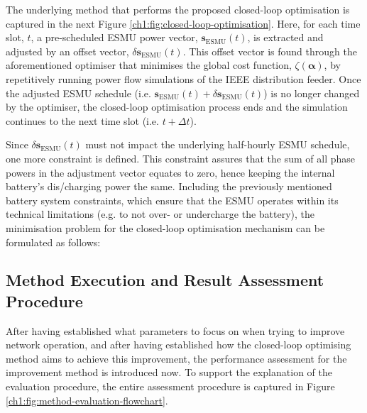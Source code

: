 

The underlying method that performs the proposed closed-loop optimisation is captured in the next Figure \ref{ch1:fig:closed-loop-optimisation}.
Here, for each time slot, $t$, a pre-scheduled ESMU power vector, $\textbf{s}_\text{ESMU}(t)$, is extracted and adjusted by an offset vector, $\delta \textbf{s}_\text{ESMU}(t)$.
This offset vector is found through the aforementioned optimiser that minimises the global cost function, $\zeta(\boldsymbol{\alpha})$, by repetitively running power flow simulations of the IEEE distribution feeder.
Once the adjusted ESMU schedule (i.e. $\textbf{s}_\text{ESMU}(t) + \delta \textbf{s}_\text{ESMU}(t)$) is no longer changed by the optimiser, the closed-loop optimisation process ends and the simulation continues to the next time slot (i.e. $t+\Delta t$).

Since $\delta \textbf{s}_\text{ESMU}(t)$ must not impact the underlying half-hourly ESMU schedule, one more constraint is defined.
This constraint assures that the sum of all phase powers in the adjustment vector equates to zero, hence keeping the internal battery's dis/charging power the same.
Including the previously mentioned battery system constraints, which ensure that the ESMU operates within its technical limitations (e.g. to not over- or undercharge the battery), the minimisation problem for the closed-loop optimisation mechanism can be formulated as follows:




\subsection{Method Execution and Result Assessment Procedure}
\label{ch1:subsec:method-execution}

After having established what parameters to focus on when trying to improve network operation, and after having established how the closed-loop optimising method aims to achieve this improvement, the performance assessment for the improvement method is introduced now.
To support the explanation of the evaluation procedure, the entire assessment procedure is captured in Figure \ref{ch1:fig:method-evaluation-flowchart}.



